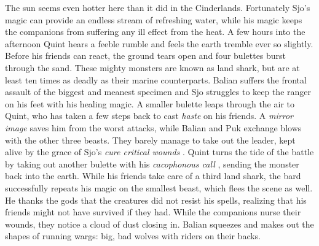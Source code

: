 The sun seems even hotter here than it did in the Cinderlands. Fortunately Sjo's magic can provide an endless stream of refreshing water, while his magic keeps the companions from suffering any ill effect from the heat. A few hours into the afternoon Quint hears a feeble rumble and feels the earth tremble ever so slightly. Before his friends can react, the ground tears open and four bulettes burst through the sand. These mighty monsters are known as land shark, but are at least ten times as deadly as their marine counterparts. Balian suffers the frontal assault of the biggest and meanest specimen and Sjo struggles to keep the ranger on his feet with his healing magic. A smaller bulette leaps through the air to Quint, who has taken a few steps back to cast {\itshape haste} on his friends. A  {\itshape mirror image} saves him from the worst attacks, while Balian and Puk exchange blows with the other three beasts. They barely manage to take out the leader, kept alive by the grace of Sjo's  {\itshape cure critical wounds} . Quint turns the tide of the battle by taking out another bulette with his  {\itshape cacophonous call} , sending the monster back into the earth. While his friends take care of a third land shark, the bard successfully repeats his magic on the smallest beast, which flees the scene as well. He thanks the gods that the creatures did not resist his spells, realizing that his friends might not have survived if they had. While the companions nurse their wounds, they notice a cloud of dust closing in. Balian squeezes and makes out the shapes of running wargs: big, bad wolves with riders on their backs.\\

